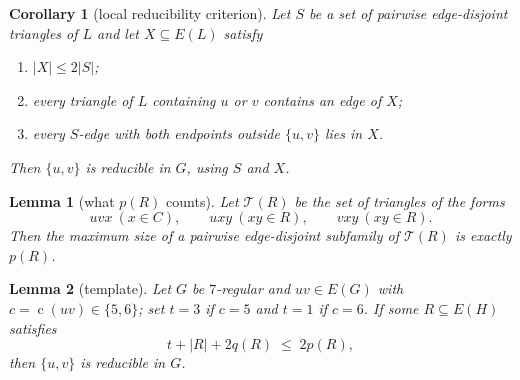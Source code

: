 \documentclass[10pt,a4paper]{amsart}
\newtheorem{lemma}{Lemma}
\newtheorem{corollary}{Corollary}
\newcommand{\cod}{\operatorname{c}}
\begin{document}
\begin{corollary}[local reducibility criterion]\label{cor:localcriterion}
Let $S$ be a set of pairwise edge-disjoint triangles of $L$ and let
$X\subseteq E(L)$ satisfy
\begin{enumerate}
  \item[(i)] $|X|\le 2|S|$;
  \item[(ii)] every triangle of $L$ containing $u$ or $v$ contains an edge of
    $X$;
  \item[(iii)] every $S$-edge with both endpoints outside $\{u,v\}$ lies in
    $X$.
\end{enumerate}
Then $\{u,v\}$ is reducible in $G$, using $S$ and $X$.
\end{corollary}

\begin{lemma}[what $p(R)$ counts]\label{lem:packing}
Let $\mathcal{T}(R)$ be the set of triangles of the forms
\[
  uvx\ (x\in C),\qquad uxy\ (xy\in R),\qquad vxy\ (xy\in R).
\]
Then the maximum size of a pairwise edge-disjoint subfamily of
$\mathcal{T}(R)$ is exactly $p(R)$.
\end{lemma}

\begin{lemma}[template]\label{lem:template}
Let $G$ be $7$-regular and $uv\in E(G)$ with $c=\cod(uv)\in\{5,6\}$; set
$t=3$ if $c=5$ and $t=1$ if $c=6$. If some $R\subseteq E(H)$ satisfies
\begin{equation}\label{eq:template}
  t+|R|+2q(R)\;\le\;2p(R),
\end{equation}
then $\{u,v\}$ is reducible in $G$.
\end{lemma}
\end{document}

